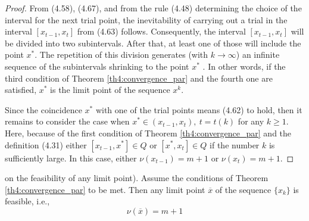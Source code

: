 \documentclass[graybox]{svmult}
\begin{document}
\begin{proof}
  From (4.58), (4.67), and from the rule (4.48) determining the choice of the interval for the next trial point, the inevitability of carrying out a trial in the interval $[x_{t-1},x_t]$ from (4.63) follows. Consequently, the interval $[x_{t-1},x_t]$ will be divided into two subintervals. After that, at least one of those will include the point $x^*$. The repetition of this division generates (with $k\to\infty$) an infinite sequence of the subintervals shrinking to the point $x^*$ . In other words, if the third condition of Theorem \ref{th4:convergence_par} and the fourth one are satisfied, $x^*$ is the limit point of the sequence ${x^k}$.

  Since the coincidence $x^*$ with one of the trial points means (4.62) to hold, then it remains to consider the case when $x^*\in(x_{t- 1} ,x_t ),\: t=t(k)$ for any $k\ge 1$. Here, because of the first condition of Theorem \ref{th4:convergence_par} and the definition (4.31) either $[x_{t-1},x^*]\in Q$ or $[x^* ,x_t]\in Q$ if the number $k$ is sufficiently large. In this case, either $\nu(x_{t-1})=m+1$ or $\nu (x_t )=m+1.$
\end{proof}

\begin{lemma}
  on the feasibility of any limit point). Assume the conditions of Theorem \ref{th4:convergence_par} to be met. Then any limit point $\overline x$ of the sequence $\{x_k\}$ is feasible, i.e.,
  \begin{equation}
    \label{eq4:68}
    \nu(\overline x)=m+1
  \end{equation}
\end{lemma}
\end{document}
